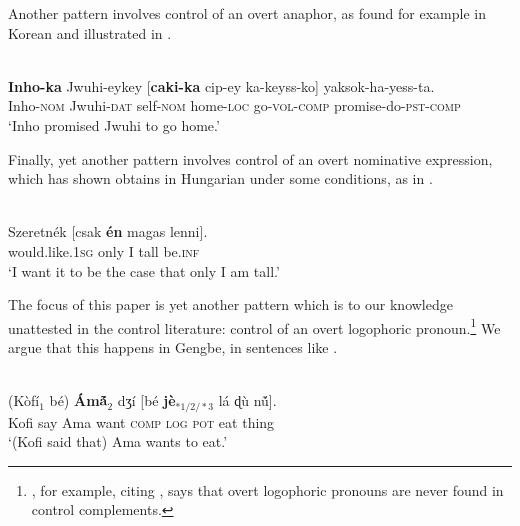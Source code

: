 \documentclass[output=paper,modfonts,nonflat]{langsci/langscibook}
\newcommand{\Z}{ʒ}
\newcommand{\D}{ɖ}
\newcommand{\á}{\'{ã}}
\newcommand{\É}{\'{\~{ε}}}
\newcommand{\È}{\`{\~{ε}}}
\newcommand{\í}{\'{\~{i}}}
\newcommand{\ì}{\`{\~{i}}}
\newcommand{\Ó}{\'{\~{ɔ}}}
\newcommand{\Ò}{\`{\~{ɔ}}}
\newcommand{\ú}{\'{ũ}}
\newcommand{\ù}{\`{ũ}}
\begin{document}
Another pattern involves control of an overt anaphor, as found for example in Korean and illustrated in .


\ea \label{ex:grano:4}
\\
\gll \textbf{Inho-ka} Jwuhi-eykey [\textbf{caki-ka} cip-ey ka-keyss-ko] yaksok-ha-yess-ta.\\
Inho-\textsc{nom} Jwuhi-\textsc{dat} self-\textsc{nom} home-\textsc{loc} go-\textsc{vol}-\textsc{comp} promise-do-\textsc{pst}-\textsc{comp}\\
\glt `Inho promised Jwuhi to go home.'\\
\z

Finally, yet another pattern involves control of an overt nominative expression, which \cite{Szabolcsi2009} has shown obtains in Hungarian under some conditions, as in .

\ea \label{ex:grano:5}
\\
\gll Szeretn\'ek [csak \textbf{\'en}  magas lenni].\\
would.like.1\textsc{sg} only I  tall be.\textsc{inf}\\
\glt `I want it to be the case that only I am tall.'\\
\z

The focus of this paper is yet another pattern which is to our knowledge unattested in the control literature: control of an overt logophoric pronoun.\footnote{\cite{Landau2015a}, for example, citing \cite{Culy1994}, says that overt logophoric pronouns are never found in control complements.}
 We argue that this happens in Gengbe, in sentences like .

\ea \label{ex:grano:wll:6}
\\
\gll (K\`of\'i$_{1}$ b\'e) \textbf{\'Am\'{\~a}$_{2}$}  d{\Z}\'i [b\'e \textbf{j\`e$_{*1/2/*3}$}  l\'a {\D}\`u n{\ú}].\\
Kofi say Ama want \textsc{comp} \textsc{log} \textsc{pot} eat thing\\
\glt `(Kofi said that) Ama wants to eat.'
\z

\end{document}
